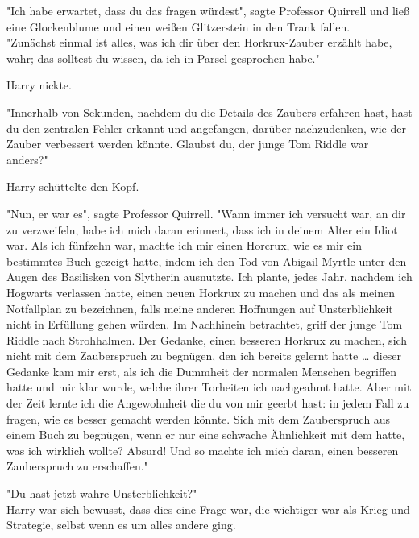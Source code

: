 {"Ich habe erwartet, dass du das fragen würdest", sagte Professor Quirrell und ließ eine Glockenblume und einen weißen Glitzerstein in den Trank fallen.\\ "Zunächst einmal ist alles, was ich dir über den Horkrux-Zauber erzählt habe, wahr; das solltest du wissen, da ich in Parsel gesprochen habe."

Harry nickte.

"Innerhalb von Sekunden, nachdem du die Details des Zaubers erfahren hast, hast du den zentralen Fehler erkannt und angefangen, darüber nachzudenken, wie der Zauber verbessert werden könnte. Glaubst du, der junge Tom Riddle war anders?"

Harry schüttelte den Kopf.

"Nun, er war es", sagte Professor Quirrell. "Wann immer ich versucht war, an dir zu verzweifeln, habe ich mich daran erinnert, dass ich in deinem Alter ein Idiot war. Als ich fünfzehn war, machte ich mir einen Horcrux, wie es mir ein bestimmtes Buch gezeigt hatte, indem ich den Tod von Abigail Myrtle unter den Augen des Basilisken von Slytherin ausnutzte. Ich plante, jedes Jahr, nachdem ich Hogwarts verlassen hatte, einen neuen Horkrux zu machen und das als meinen Notfallplan zu bezeichnen, falls meine anderen Hoffnungen auf Unsterblichkeit nicht in Erfüllung gehen würden. Im Nachhinein betrachtet, griff der junge Tom Riddle nach Strohhalmen. Der Gedanke, einen besseren Horkrux zu machen, sich nicht mit dem Zauberspruch zu begnügen, den ich bereits gelernt hatte … dieser Gedanke kam mir erst, als ich die Dummheit der normalen Menschen begriffen hatte und mir klar wurde, welche ihrer Torheiten ich nachgeahmt hatte. Aber mit der Zeit lernte ich die Angewohnheit die du von mir geerbt hast: in jedem Fall zu fragen, wie es besser gemacht werden könnte. Sich mit dem Zauberspruch aus einem Buch zu begnügen, wenn er nur eine schwache Ähnlichkeit mit dem hatte, was ich wirklich wollte? Absurd! Und so machte ich mich daran, einen besseren Zauberspruch zu erschaffen."

"Du hast jetzt wahre Unsterblichkeit?"\\ Harry war sich bewusst, dass dies eine Frage war, die wichtiger war als Krieg und Strategie, selbst wenn es um alles andere ging.

}
